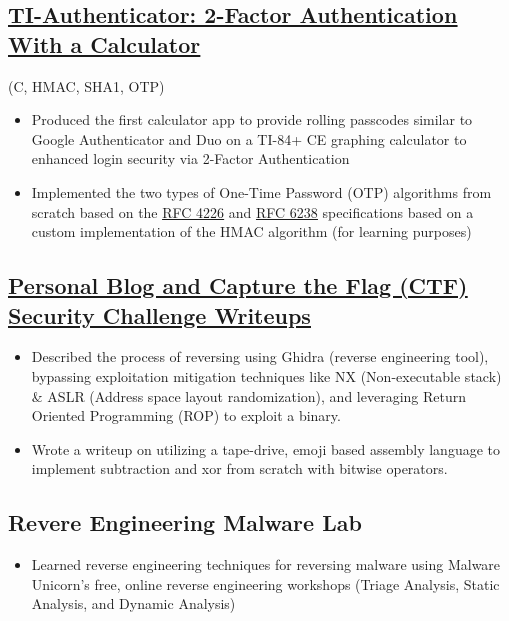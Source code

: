 \documentclass{article}
\begin{document}
\subsection{\href{https://youtu.be/dQw4w9WgXcQ}{\underline{TI-Authenticator: 2-Factor Authentication With a Calculator}}} \hfill (C, HMAC, SHA1, OTP)
\begin{itemize}
    \item Produced the first calculator app to provide rolling passcodes similar to Google Authenticator and Duo on a TI-84+ CE graphing calculator to enhanced login security via 2-Factor Authentication
    \item Implemented the two types of One-Time Password (OTP) algorithms from scratch based on the \href{https://youtu.be/dQw4w9WgXcQ}{\underline{RFC 4226}} and \href{https://youtu.be/dQw4w9WgXcQ}{\underline{RFC 6238}} specifications based on a custom implementation of the HMAC algorithm (for learning purposes)
\end{itemize}

\subsection{\href{https://youtu.be/dQw4w9WgXcQ}{ \underline{Personal Blog and Capture the Flag (CTF) Security Challenge Writeups}}}
\begin{itemize}
    \item Described the process of reversing using Ghidra (reverse engineering tool), bypassing exploitation mitigation techniques like NX (Non-executable stack) \& ASLR (Address space layout randomization), and leveraging Return Oriented Programming (ROP) to exploit a binary.
    \item Wrote a writeup on utilizing a tape-drive, emoji based assembly language to implement subtraction and xor from scratch with bitwise operators.
\end{itemize}

\subsection{Revere Engineering Malware Lab}
\begin{itemize}
    \item Learned reverse engineering techniques for reversing malware using Malware Unicorn's free, online reverse engineering workshops (Triage Analysis, Static Analysis, and Dynamic Analysis)
\end{itemize}
\end{document}

